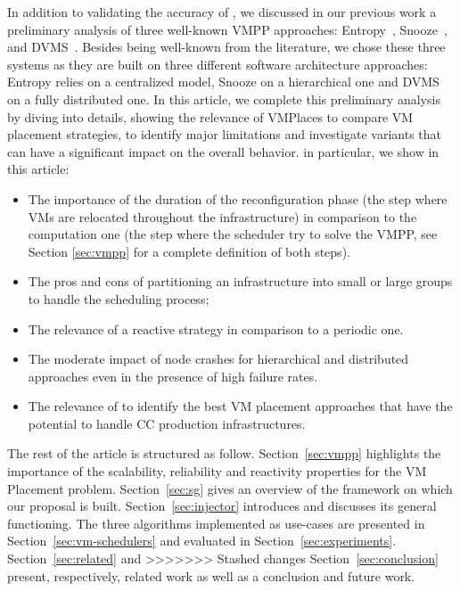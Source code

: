 In addition to validating the accuracy of \vmps, we discussed in our
previous work \cite{vmplaces:europar15} a preliminary analysis of
three well-known VMPP approaches:
Entropy~\cite{Hermenier:2009:ECM:1508293.1508300},
Snooze~\cite{feller:ccgrid12}, and DVMS~\cite{quesnel:cpe2012}.
Besides being well-known from the literature, we chose these three
systems as they are built on three different software architecture
approaches: Entropy relies on a centralized model, Snooze on a
hierarchical one and DVMS on a fully distributed one. In this article,
we complete this preliminary analysis by diving into details, showing
the relevance of VMPlaces to compare VM placement strategies, to
identify major limitations and investigate variants that can have a
significant impact on the overall behavior.  in particular, we show in
this article:
\begin{itemize}
  \item The importance of the duration of the reconfiguration phase
    (\ie the step where VMs are relocated throughout the
    infrastructure) in comparison to the computation one (\ie the step
    where the scheduler try to solve the VMPP, see Section
    \ref{sec:vmpp} for a complete definition of both steps).
  \item The pros and cons of partitioning an infrastructure into small
    or large groups to handle the scheduling process;
  \item The relevance of a reactive strategy in comparison to a
    periodic one.
  \item The moderate impact of node crashes for hierarchical and
    distributed approaches even in the presence of high failure rates.
  \item The relevance of \vmps to identify the best VM placement
    approaches that have the potential to handle CC production
    infrastructures.
\end{itemize}

The rest of the article is structured as
follow. Section~\ref{sec:vmpp} highlights the importance of the
scalability, reliability and reactivity properties for the VM
Placement problem.  Section~\ref{sec:sg} gives an overview of the \sg
framework on which our proposal is built. Section~\ref{sec:injector}
introduces \vmps and discusses its general functioning. The three
algorithms implemented as use-cases are presented in
Section~\ref{sec:vm-schedulers} and evaluated in
Section~\ref{sec:experiments}. Section~\ref{sec:related} and
>>>>>>> Stashed changes
Section~\ref{sec:conclusion} present, respectively, related work as
well as a conclusion and future work.

